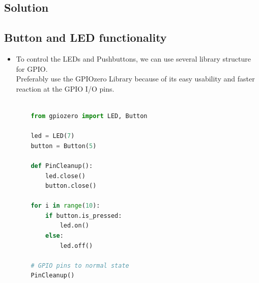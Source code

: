 

\subsection*{\Large Solution}

\subsection*{\Large Button and LED functionality}
    \begin{itemize}
        \item  To control the LEDs and Pushbuttons, we can use several library structure for GPIO.\\
        Preferably use the GPIOzero  Library because of its easy usability and faster reaction at the GPIO I/O pins. 
        \begin{lstlisting}[language=Python]
            
    from gpiozero import LED, Button

    led = LED(7)
    button = Button(5)

    def PinCleanup():
        led.close()
        button.close()

    for i in range(10):
        if button.is_pressed:
            led.on()
        else:
            led.off()

    # GPIO pins to normal state
    PinCleanup()
        
    \end{lstlisting}
    \end{itemize}
\newpage
